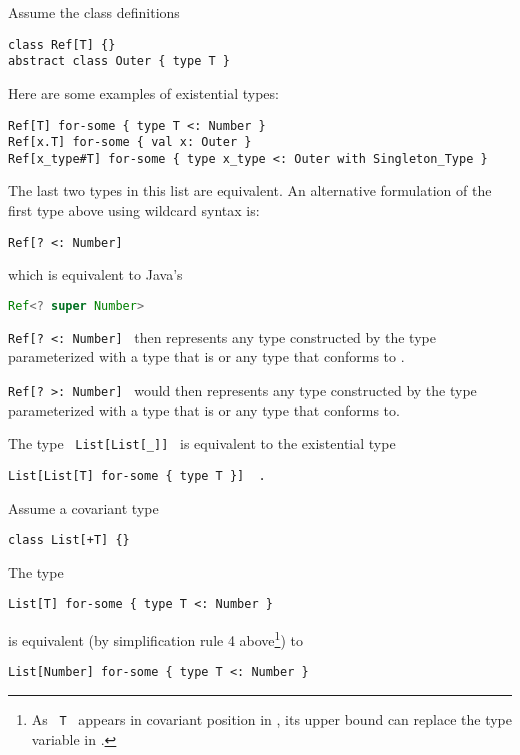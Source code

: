 \example Assume the class definitions
\begin{lstlisting}
class Ref[T] {}
abstract class Outer { type T }
\end{lstlisting}

Here are some examples of existential types:
\begin{lstlisting}
Ref[T] for-some { type T <: Number }
Ref[x.T] for-some { val x: Outer }
Ref[x_type#T] for-some { type x_type <: Outer with Singleton_Type }
\end{lstlisting}

The last two types in this list are equivalent. An alternative formulation of the first type above using wildcard syntax is:
\begin{lstlisting}
Ref[? <: Number]
\end{lstlisting}

which is equivalent to Java's
\begin{lstlisting}[language=Java]
Ref<? super Number>
\end{lstlisting}

\lstinline!Ref[? <: Number]!~ then represents any type constructed by the type parameterized with a type that is  or any type that conforms to . 

\lstinline!Ref[? >: Number]!~ would then represents any type constructed by the type  parameterized with a type that is  or any type that  conforms to. 

\example The type ~\lstinline!List[List[_]]!~ is equivalent to the existential type
\begin{lstlisting}
List[List[T] for-some { type T }]  .
\end{lstlisting}

\example Assume a covariant type
\begin{lstlisting}
class List[+T] {}
\end{lstlisting}

The type 
\begin{lstlisting}
List[T] for-some { type T <: Number }
\end{lstlisting}

is equivalent (by simplification rule 4 above\footnote{As ~\lstinline!T!~ appears in covariant position in , its upper bound can replace the type variable in .}) to
\begin{lstlisting}
List[Number] for-some { type T <: Number }
\end{lstlisting}

